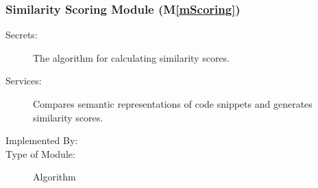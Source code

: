 \documentclass[12pt, titlepage]{article}
\newcommand{\mref}[1]{M\ref{#1}}
\begin{document}
\subsubsection{Similarity Scoring Module (\mref{mScoring})}

\begin{description}
\item[Secrets:] The algorithm for calculating similarity scores.
\item[Services:] Compares semantic representations of code snippets and generates similarity scores.
\item[Implemented By:] \progname{}
\item[Type of Module:] Algorithm
\end{description}





\end{document}
